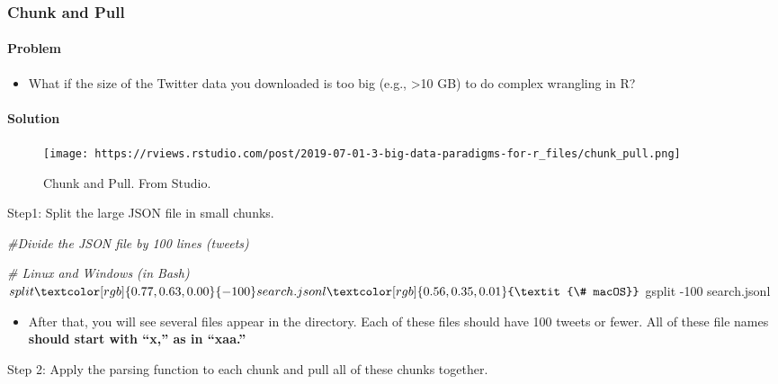 \documentclass[
]{book}
\newenvironment{Shaded}{\begin{snugshade}}{\end{snugshade}}
\newcommand{\AttributeTok}[1]{\textcolor[rgb]{0.77,0.63,0.00}{#1}}
\newcommand{\CommentTok}[1]{\textcolor[rgb]{0.56,0.35,0.01}{\textit{#1}}}
\newcommand{\ExtensionTok}[1]{#1}
\newcommand{\NormalTok}[1]{#1}
\providecommand{\tightlist}{%
  \setlength{\itemsep}{0pt}\setlength{\parskip}{0pt}}
\begin{document}
\hypertarget{chunk-and-pull}{%
\subsubsection{Chunk and Pull}\label{chunk-and-pull}}

\hypertarget{problem-3}{%
\paragraph{Problem}\label{problem-3}}

\begin{itemize}
\tightlist
\item
  What if the size of the Twitter data you downloaded is too big (e.g., \textgreater10 GB) to do complex wrangling in R?
\end{itemize}

\hypertarget{solution-2}{%
\paragraph{Solution}\label{solution-2}}

\begin{figure}
\centering
\texttt{[image: https://rviews.rstudio.com/post/2019-07-01-3-big-data-paradigms-for-r\_files/chunk\_pull.png]}
\caption{Chunk and Pull. From Studio.}
\end{figure}

Step1: Split the large JSON file in small chunks.

\begin{Shaded}
\begin{Highlighting}[]
\CommentTok{\#Divide the JSON file by 100 lines (tweets)}

\CommentTok{\# Linux and Windows (in Bash)}
\ExtensionTok{$}\NormalTok{ split }\AttributeTok{{-}100}\NormalTok{ search.jsonl}

\CommentTok{\# macOS}
\ExtensionTok{$}\NormalTok{ gsplit }\AttributeTok{{-}100}\NormalTok{ search.jsonl}
\end{Highlighting}
\end{Shaded}

\begin{itemize}
\tightlist
\item
  After that, you will see several files appear in the directory. Each of these files should have 100 tweets or fewer. All of these file names \textbf{should start with ``x,'' as in ``xaa.''}
\end{itemize}

Step 2: Apply the parsing function to each chunk and pull all of these chunks together.
\end{document}
